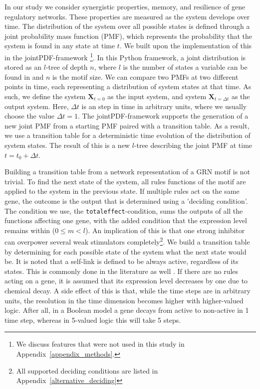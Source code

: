 \documentclass[../main.tex]{subfiles}
\begin{document}
In our study we consider synergistic properties, memory, and resilience of gene regulatory networks.
These properties are measured as the system develops over time.
The distribution of the system over all possible states is defined through a joint probability mass function (PMF), which represents the probability that the system is found in any state at time $t$.
We built upon the implementation of this in the jointPDF-framework \cite{jointpdf}\footnote{We discuss features that were not used in this study in Appendix~\ref{appendix_methods}.}.
In this Python framework, a joint distribution is stored as an $l$-tree of depth $n$, where $l$ is the number of states a variable can be found in and $n$ is the motif size.
We can compare two PMFs at two different points in time, each representing a distribution of system states at that time.
As such, we define the system $\mathbf{X}_{t=0}$ as the input system, and system $\mathbf{X}_{t=\Delta t}$ as the output system.
Here, $\Delta t$ is an step in time in arbitrary units, where we usually choose the value $\Delta t = 1$.
The jointPDF-framework supports the generation of a new joint PMF from a starting PMF paired with a transition table.
As a result, we use a transition table for a deterministic time evolution of the distribution of system states.
The result of this is a new $l$-tree describing the joint PMF at time $t=t_0+\Delta t$.

Building a transition table from a network representation of a GRN motif is not trivial.
To find the next state of the system, all rules functions of the motif are applied to the system in the previous state.
If multiple rules act on the same gene, the outcome is the output that is determined using a 'deciding condition'.
The condition we use, the \texttt{totaleffect}-condition, sums the outputs of all the functions affecting one gene, with the added condition that the expression level remains within ($0 \le m < l$).
An implication of this is that one strong inhibitor can overpower several weak stimulators completely\footnote{All supported deciding conditions are listed in Appendix~\ref{alternative_deciding}}.
We build a transition table by determining for each possible state of the system what the next state would be.
It is noted that a self-link is defined to be always active, regardless of its states.
This is commonly done in the literature as well \cite{thomas1995dynamical, zhou2016relative}.
If there are no rules acting on a gene, it is assumed that its expression level decreases by one due to chemical decay.
A side effect of this is that, while the time steps are in arbitrary units, the resolution in the time dimension becomes higher with higher-valued logic.
After all, in a Boolean model a gene decays from active to non-active in 1 time step, whereas in 5-valued logic this will take 5 steps.
\end{document}
